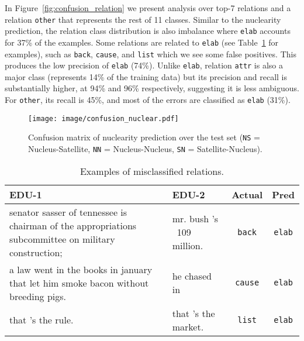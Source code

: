 \documentclass[11pt,a4paper]{article}
\newcommand{\rstrel}[1]{\texttt{#1}\xspace}
\newcommand{\tabref}[2][]{Table#1~\ref{tab:#2}}
\newcommand{\figref}[2][]{Figure#1~\ref{fig:#2}}
\begin{document}
In \figref{confusion_relation} we present analysis over top-7 relations 
and a relation \rstrel{other} that represents the rest of 
11 classes.
Similar to the nuclearity prediction, the relation class distribution is 
also imbalance where \rstrel{elab} accounts for 37\% of the examples.  
Some relations are related to \rstrel{elab} (see \tabref{relation_ex} 
for examples), such as \rstrel{back}, \rstrel{cause}, and \rstrel{list} 
which we see some false positives.  This produces the low precision of 
\rstrel{elab} (74\%).  Unlike \rstrel{elab}, relation \rstrel{attr} is 
also a major class (represents 14\% of the training data) but its precision and 
recall is substantially higher, at 94\% and 96\% respectively, 
suggesting it is less ambiguous.  For \rstrel{other}, its recall is 
45\%, and most of the errors are classified as \rstrel{elab} (31\%).






\begin{figure}[]
	\centering
	\texttt{[image: image/confusion\_nuclear.pdf]}
	\caption{Confusion matrix of nuclearity prediction over the test set (\rstrel{NS} = Nucleus-Satellite, \rstrel{NN} = Nucleus-Nucleus, \rstrel{SN} = Satellite-Nucleus).}
	\label{fig:confusion_nuclear}
\end{figure}

\begin{table}[t]
	\begin{center}
		\begin{adjustbox}{max width=1\linewidth}
			\begin{tabular}{p{3.4cm}p{3.4cm}cc}
				\toprule
				\textbf{EDU-1} & \textbf{EDU-2} & \textbf{Actual} &\textbf{Pred} \\
				\midrule
				senator sasser of tennessee is chairman of the appropriations subcommittee on military construction; & mr. bush 's \ 109 million.&\rstrel{back}&\rstrel{elab}\\
				\midrule
				a law went in the books in january that let him smoke bacon without breeding pigs. & he chased in & \rstrel{cause} & \rstrel{elab} \\
				\midrule
				that 's the rule. & that 's the market. &  \rstrel{list} & \rstrel{elab} \\
				\bottomrule
			\end{tabular}
		\end{adjustbox}
	\end{center}
	\caption{Examples of misclassified relations.}
	\label{tab:relation_ex}
\end{table}
\end{document}
